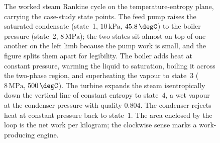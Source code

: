 \begin{figure}[htbp]
\caption[Temperature-entropy diagram of the worked Rankine cycle]{The
worked steam Rankine cycle on the temperature-entropy plane, carrying the
case-study state points. The feed pump raises the saturated condensate
(state~1, $10\,\text{kPa}$, $45.8\,\degC$) to the boiler pressure
(state~2, $8\,\text{MPa}$); the two states sit almost on top of one
another on the left limb because the pump work is small, and the figure
splits them apart for legibility. The boiler adds heat at constant
pressure, warming the liquid to saturation, boiling it across the
two-phase region, and superheating the vapour to state~3
($8\,\text{MPa}$, $500\,\degC$). The turbine expands the steam
isentropically down the vertical line of constant entropy to state~4, a
wet vapour at the condenser pressure with quality $0.804$. The condenser
rejects heat at constant pressure back to state~1. The area enclosed by
the loop is the net work per kilogram; the clockwise sense marks a
work-producing engine.}
\label{fig:vol04ch02:rankine-ts-cycle}
\end{figure}

